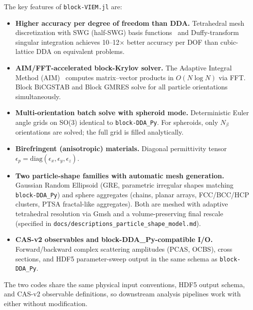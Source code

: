 \documentclass[11pt,a4paper]{article}
\begin{document}
The key features of \texttt{block-VIEM.jl} are:
\begin{itemize}
  \item \textbf{Higher accuracy per degree of freedom than DDA.}
        Tetrahedral mesh discretization with SWG (half-SWG) basis
        functions~\cite{SWG1984} and Duffy-transform singular
        integration achieves 10--12$\times$ better accuracy per DOF
        than cubic-lattice DDA on equivalent problems.
  \item \textbf{AIM/FFT-accelerated block-Krylov solver.}
        The Adaptive Integral Method (AIM)~\cite{Bleszynski1996}
        computes matrix--vector products in $O(N \log N)$ via FFT.
        Block BiCGSTAB and Block GMRES solve for all particle
        orientations simultaneously.
  \item \textbf{Multi-orientation batch solve with spheroid mode.}
        Deterministic Euler angle grids on SO(3) identical to
        \texttt{block-DDA\_Py}. For spheroids, only $N_\beta$
        orientations are solved; the full grid is filled analytically.
  \item \textbf{Birefringent (anisotropic) materials.}
        Diagonal permittivity tensor
        $\epsilon_p = \mathrm{diag}(\epsilon_x, \epsilon_y, \epsilon_z)$.
  \item \textbf{Two particle-shape families with automatic mesh generation.}
        Gaussian Random Ellipsoid (GRE, parametric irregular shapes
        matching \texttt{block-DDA\_Py}) and sphere aggregates
        (chains, planar arrays, FCC/BCC/HCP clusters, PTSA fractal-like
        aggregates).  Both are meshed with adaptive tetrahedral
        resolution via Gmsh and a volume-preserving final rescale
        (specified in
        \texttt{docs/descriptions\_particle\_shape\_model.md}).
  \item \textbf{CAS-v2 observables and block-DDA\_Py-compatible I/O.}
        Forward/backward complex scattering amplitudes (PCAS, OCBS),
        cross sections, and HDF5 parameter-sweep output in the same
        schema as \texttt{block-DDA\_Py}.
\end{itemize}

The two codes share the same physical input conventions, HDF5 output
schema, and CAS-v2 observable definitions, so downstream analysis
pipelines work with either without modification.
\end{document}
